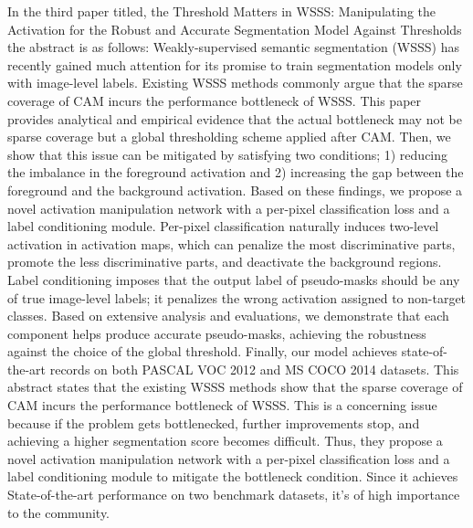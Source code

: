 \documentclass[11pt]{article}
\begin{document}
 In the third paper titled,  the Threshold Matters in WSSS: Manipulating the Activation for the Robust and Accurate Segmentation Model Against Thresholds the abstract is as follows: \newline 
 Weakly-supervised semantic segmentation (WSSS) has recently gained much attention for its promise to train segmentation models only with image-level labels. Existing WSSS methods commonly argue that the sparse coverage of CAM incurs the performance bottleneck of WSSS. This paper provides analytical and empirical evidence that the actual bottleneck may not be sparse coverage but a global thresholding scheme applied after CAM. Then, we show that this issue can be mitigated by satisfying two conditions; 1) reducing the imbalance in the foreground activation and 2) increasing the gap between the foreground and the background activation. Based on these findings, we propose a novel activation manipulation network with a per-pixel classification loss and a label conditioning module. Per-pixel classification naturally induces two-level activation in activation maps, which can penalize the most discriminative parts, promote the less discriminative parts, and deactivate the background regions. Label conditioning imposes that the output label of pseudo-masks should be any of true image-level labels; it penalizes the wrong activation assigned to non-target classes. Based on extensive analysis and evaluations, we demonstrate that each component helps produce accurate pseudo-masks, achieving the robustness against the choice of the global threshold. Finally, our model achieves state-of-the-art records on both PASCAL VOC 2012 and MS COCO 2014 datasets. \newline 
 This abstract states that the existing WSSS methods show that the sparse coverage of CAM incurs the performance bottleneck of WSSS. This is a concerning issue because if the problem gets bottlenecked, further improvements stop, and achieving a higher segmentation score becomes difficult. Thus, they propose a novel activation manipulation network with a per-pixel classification loss and a label conditioning module to mitigate the bottleneck condition. Since it achieves State-of-the-art performance on two benchmark datasets, it's of high importance to the community. 
\end{document}
